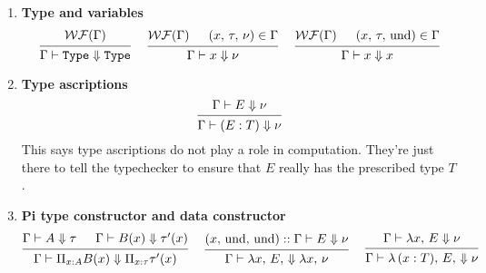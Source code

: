 \documentclass{article}
\begin{document}
\begin{enumerate}
\item \textbf{Type and variables}
  \begin{gather*}
    \begin{prooftree}
      \hypo{\wf(\Gamma)}
      \infer1{\Gamma \vdash \Type \Downarrow \Type} 
    \end{prooftree}
   ~ \quad
    \begin{prooftree}
      \hypo{\wf(\Gamma)}
      \hypo{(x, \, \tau, \, \nu) \in \Gamma}
      \infer2{\Gamma \vdash x \Downarrow \nu}
    \end{prooftree} 
    ~ \quad
    \begin{prooftree}
      \hypo{\wf(\Gamma)}
      \hypo{(x, \, \tau, \, \text{und}) \in \Gamma}
      \infer2{\Gamma \vdash x \Downarrow x}
    \end{prooftree}
  \end{gather*}

\item \textbf{Type ascriptions} \\
  \[
    \begin{prooftree}
      \hypo{\Gamma \vdash E \Downarrow \nu}
      \infer1{\Gamma \vdash (E : T) \Downarrow \nu}
    \end{prooftree}
  \]
  This says type ascriptions do not play a role in computation. They're just
  there to tell the typechecker to ensure that $E$ really has the prescribed type
  $T$.

 \item \textbf{Pi type constructor and data constructor} \\
  \begin{gather*}
    \begin{prooftree}
      \hypo{\Gamma \vdash A \Downarrow \tau}
      \hypo{\Gamma \vdash B(x) \Downarrow \tau'(x)}
      \infer2{\Gamma \vdash \Pi_{x : A} B(x) \Downarrow \Pi_{x : \tau} \tau'(x)}
    \end{prooftree}
    ~ \quad
    \begin{prooftree}
      \hypo{(x, \, \text{und}, \, \text{und}) :: \Gamma \vdash E \Downarrow \nu}
      \infer1{\Gamma \vdash \lambda x, \, E, \, \Downarrow \lambda x, \, \nu}
    \end{prooftree}
    ~ \quad
    \begin{prooftree}
      \hypo{\Gamma \vdash \lambda x, \, E \Downarrow \nu}
      \infer1{\Gamma \vdash \lambda \, (x : T), \, E, \, \Downarrow \nu}
    \end{prooftree}
  \end{gather*}
 

\end{enumerate}
\end{document}
